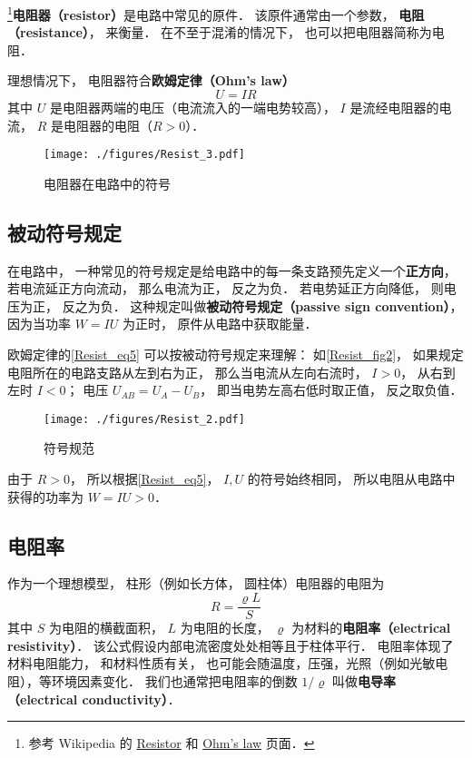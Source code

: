 

\footnote{参考 Wikipedia 的 \href{https://en.wikipedia.org/wiki/Resistor}{Resistor} 和 \href{https://en.wikipedia.org/wiki/Ohm's_law}{Ohm's law} 页面．}\textbf{电阻器（resistor）}是电路中常见的原件． 该原件通常由一个参数， \textbf{电阻（resistance）}， 来衡量． 在不至于混淆的情况下， 也可以把电阻器简称为电阻．

理想情况下， 电阻器符合\textbf{欧姆定律（Ohm's law）}
\begin{equation}\label{Resist_eq5}
U = IR
\end{equation}
其中 $U$ 是电阻器两端的电压（电流流入的一端电势较高）， $I$ 是流经电阻器的电流， $R$ 是电阻器的电阻（$R > 0$）．

\begin{figure}[ht]
\centering
\texttt{[image: ./figures/Resist\_3.pdf]}
\caption{电阻器在电路中的符号} \label{Resist_fig3}
\end{figure}

\subsection{被动符号规定}\label{Resist_sub1}
在电路中， 一种常见的符号规定是给电路中的每一条支路预先定义一个\textbf{正方向}， 若电流延正方向流动， 那么电流为正， 反之为负． 若电势延正方向降低， 则电压为正， 反之为负． 这种规定叫做\textbf{被动符号规定（passive sign convention）}， 因为当功率 $W = IU$ 为正时， 原件从电路中获取能量．

欧姆定律的\autoref{Resist_eq5} 可以按被动符号规定来理解： 如\autoref{Resist_fig2}， 如果规定电阻所在的电路支路从左到右为正， 那么当电流从左向右流时， $I > 0$， 从右到左时 $I < 0$； 电压 $U_{AB} = U_A - U_B$， 即当电势左高右低时取正值， 反之取负值．

\begin{figure}[ht]
\centering
\texttt{[image: ./figures/Resist\_2.pdf]}
\caption{符号规范} \label{Resist_fig2}
\end{figure}

由于 $R > 0$， 所以根据\autoref{Resist_eq5}， $I, U$ 的符号始终相同， 所以电阻从电路中获得的功率为 $W = IU > 0$．

\subsection{电阻率}
作为一个理想模型， 柱形（例如长方体， 圆柱体）电阻器的电阻为
\begin{equation}
R = \frac{\varrho L}{S} 
\end{equation}
其中 $S$ 为电阻的横截面积， $L$ 为电阻的长度， $\varrho$ 为材料的\textbf{电阻率（electrical resistivity）}． 该公式假设内部电流密度处处相等且于柱体平行． 电阻率体现了材料电阻能力， 和材料性质有关， 也可能会随温度，压强，光照（例如光敏电阻），等环境因素变化． 我们也通常把电阻率的倒数 $1/\varrho$ 叫做\textbf{电导率（electrical conductivity）}．

